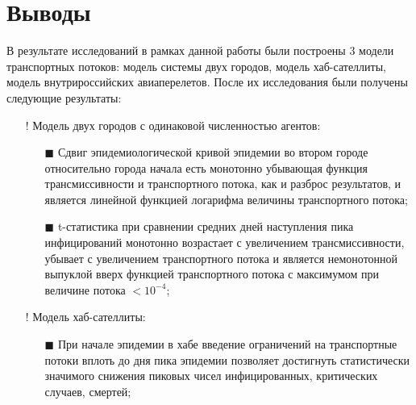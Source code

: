 \documentclass[a4paper,12pt]{article} %
\begin{document}
\section{Выводы}
В результате исследований в рамках данной работы были построены 3 модели транспортных потоков: модель системы двух городов, модель хаб-сателлиты, модель внутрироссийских авиаперелетов. После их исследования были получены следующие результаты:
\begin{itemize}
\item[!] Модель двух городов с одинаковой численностью агентов:
\begin{itemize}
\item[$\blacksquare$] Сдвиг эпидемиологической кривой эпидемии во втором городе относительно города начала есть монотонно убывающая функция трансмиссивности и транспортного потока, как и разброс результатов, и является линейной функцией логарифма величины транспортного потока;
\item[$\blacksquare$] t-статистика при сравнении средних дней наступления пика инфицирований монотонно возрастает с увеличением трансмиссивности, убывает с увеличением транспортного потока и является немонотонной выпуклой вверх функцией транспортного потока с максимумом при величине потока $< 10^{-4}$;
\end{itemize}
\item[!] Модель хаб-сателлиты:
\begin{itemize}
\item[$\blacksquare$] При начале эпидемии в хабе введение ограничений на транспортные потоки вплоть до
дня пика эпидемии позволяет достигнуть статистически значимого снижения пиковых
чисел инфицированных, критических случаев, смертей;

\end{itemize}
\end{itemize}
\end{document}
